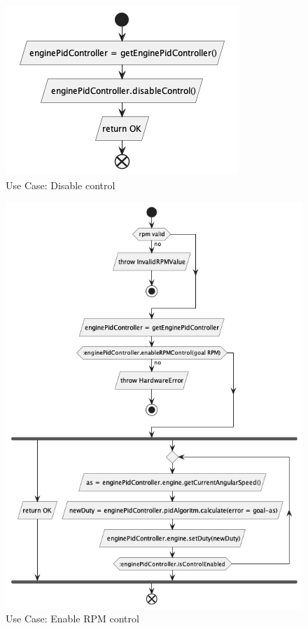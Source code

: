 \begin{figure}[H]
    \centering
    \includegraphics[height=0.2\textheight]{./part/Proyecto_ejecutivo/memoria_descriptiva/descripcionDelProyecto/control/uml/disableControl}
    \caption{Use Case: Disable control}\label{fig:Use Case- Disable control}
\end{figure}

\begin{figure}[H]
    \centering
    \includegraphics[height=0.65\textheight]{./part/Proyecto_ejecutivo/memoria_descriptiva/descripcionDelProyecto/control/uml/enableRPMControl}
    \caption{Use Case: Enable RPM control}\label{fig:Use Case- Enable RPM control}
\end{figure}

